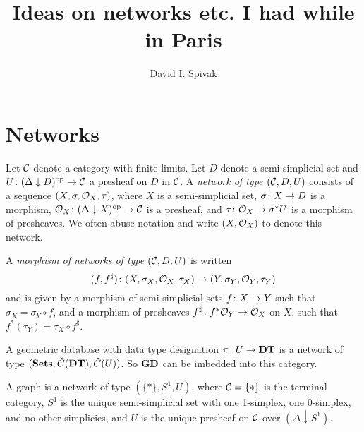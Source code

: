 \documentclass{amsart}
\def\DT{{\bf DT}}
\def\GD{{\bf GD}}
\begin{document}
\author{David I. Spivak}

\title{Ideas on networks etc. I had while in Paris}

\maketitle

\tableofcontents

\section{Networks}

\begin{definition}

Let $\mathcal{C}$ denote a category with finite limits.  Let $D$ denote a semi-simplicial set and $U\colon(\Delta\downarrow D)^\textnormal{op}\rightarrow\mathcal{C}$ a presheaf on $D$ in $\mathcal{C}$.  A {\em network of type $(\mathcal{C},D,U)$} consists of a sequence $(X,\sigma,\mathcal{O}_X,\tau)$, where $X$ is a semi-simplicial set, $\sigma\colon X\rightarrow D$ is a morphism, $\mathcal{O}_X\colon (\Delta\downarrow X)^\textnormal{op}\rightarrow\mathcal{C}$ is a presheaf, and $\tau\colon\mathcal{O}_X\rightarrow\sigma^*U$ is a morphism of presheaves.  We often abuse notation and write $(X,\mathcal{O}_X)$ to denote this network.

A {\em morphism of networks of type $(\mathcal{C},D,U)$} is written $$(f,f^\sharp)\colon (X,\sigma_X,\mathcal{O}_X,\tau_X)\rightarrow(Y,\sigma_Y,\mathcal{O}_Y,\tau_Y)$$ and is given by a morphism of semi-simplicial sets $f\colon X\rightarrow Y$ such that $\sigma_X=\sigma_Y\circ f$, and a morphism of presheaves $f^\sharp\colon f^*\mathcal{O}_Y\rightarrow\mathcal{O}_X$ on $X$, such that $f^*(\tau_Y)=\tau_X\circ f^\sharp$.

\end{definition}

\begin{example}

A geometric database with data type designation $\pi\taking U\to\DT$ is a network of type $(\Sets,\C(\DT),\C(U))$.  So $\GD$ can be imbedded into this category.

\end{example}

\begin{example}

A graph is a network of type $(\{*\},S^1,U)$, where $\mathcal{C}=\{*\}$ is the terminal category, $S^1$ is the unique semi-simplicial set with one 1-simplex, one 0-simplex, and no other simplicies, and $U$ is the unique presheaf on $\mathcal{C}$ over $(\Delta\downarrow S^1)$.  

\end{example}
\end{document}
